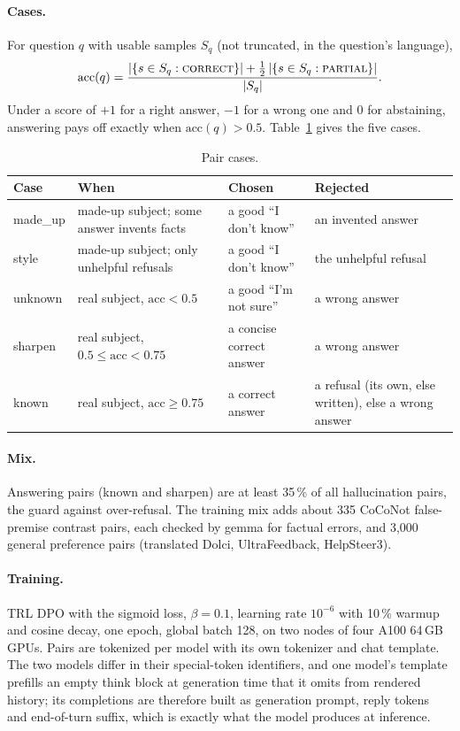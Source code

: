 \documentclass[11pt,a4paper]{article}
\begin{document}
\paragraph{Cases.}
For question $q$ with usable samples $S_q$ (not truncated, in the question's language),
\begin{equation}
  \mathrm{acc}(q) = \frac{|\{s \in S_q : \textsc{correct}\}| + \tfrac12\,|\{s \in S_q : \textsc{partial}\}|}{|S_q|}.
\end{equation}
Under a score of $+1$ for a right answer, $-1$ for a wrong one and $0$ for abstaining, answering pays off exactly when $\mathrm{acc}(q) > 0.5$.
Table~\ref{tab:cases} gives the five cases.

\begin{table}[t]
\centering
\small
\begin{tabularx}{\linewidth}{@{}lXXX@{}}
\toprule
Case & When & Chosen & Rejected \\
\midrule
made\_up & made-up subject; some answer invents facts & a good ``I don't know'' & an invented answer \\
style & made-up subject; only unhelpful refusals & a good ``I don't know'' & the unhelpful refusal \\
unknown & real subject, $\mathrm{acc} < 0.5$ & a good ``I'm not sure'' & a wrong answer \\
sharpen & real subject, $0.5 \le \mathrm{acc} < 0.75$ & a concise correct answer & a wrong answer \\
known & real subject, $\mathrm{acc} \ge 0.75$ & a correct answer & a refusal (its own, else written), else a wrong answer \\
\bottomrule
\end{tabularx}
\caption{Pair cases.}
\label{tab:cases}
\end{table}

\paragraph{Mix.}
Answering pairs (known and sharpen) are at least 35\,\% of all hallucination pairs, the guard against over-refusal.
The training mix adds about 335 CoCoNot false-premise contrast pairs, each checked by gemma for factual errors, and 3,000 general preference pairs (translated Dolci, UltraFeedback, HelpSteer3).

\paragraph{Training.}
TRL DPO with the sigmoid loss, $\beta = 0.1$, learning rate $10^{-6}$ with 10\,\% warmup and cosine decay, one epoch, global batch 128, on two nodes of four A100 64\,GB GPUs.
Pairs are tokenized per model with its own tokenizer and chat template.
The two models differ in their special-token identifiers, and one model's template prefills an empty think block at generation time that it omits from rendered history; its completions are therefore built as generation prompt, reply tokens and end-of-turn suffix, which is exactly what the model produces at inference.
\end{document}
